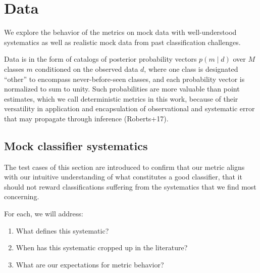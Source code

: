 \section{Data}
\label{sec:data}

We explore the behavior of the metrics on mock data with well-understood systematics as well as realistic mock data from past classification challenges.

Data is in the form of catalogs of posterior probability vectors $p(m \mid d)$ over $M$ classes $m$ conditioned on the observed data $d$, where one class is designated ``other'' to encompass never-before-seen classes, and each probability vector is normalized to sum to unity.
Such probabilities are more valuable than point estimates, which we call deterministic metrics in this work, because of their versatility in application and encapsulation of observational and systematic error that may propagate through inference (Roberts+17).

\subsection{Mock classifier systematics}
\label{sec:mockdata}

The test cases of this section are introduced to confirm that our metric aligns with our intuitive understanding of what constitutes a good classifier, that it should not reward classifications suffering from the systematics that we find most concerning.

For each, we will address:
\begin{enumerate}
  \item What defines this systematic?
  \item When has this systematic cropped up in the literature?
  \item What are our expectations for metric behavior?
\end{enumerate}



